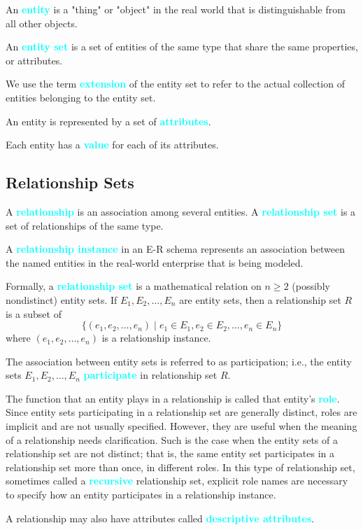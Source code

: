 \documentclass[a4paper,12pt,twoside,openany]{book}
\newcommand{\textcy}[1]{\textbf{\textcolor{cyan}{#1}}}
\begin{document}
An \textcy{entity} is a "thing" or "object" in the real world that is distinguishable from all other objects.

An \textcy{entity set} is a set of entities of the same type that share the same properties, or attributes.

We use the term \textcy{extension} of the entity set to refer to the actual collection of entities belonging to the entity set.

An entity is represented by a set of \textcy{attributes}.

Each entity has a \textcy{value} for each of its attributes.

\subsection{Relationship Sets}

A \textcy{relationship} is an association among several entities. A \textcy{relationship set} is a set of relationships of the same type.

A \textcy{relationship instance} in an E-R schema represents an association between the named entities in the real-world enterprise that is being modeled.

Formally, a \textcy{relationship set} is a mathematical relation on $n\ge 2$ (possibly nondistinct) entity sets. If $E_1,E_2,\ldots,E_n$ are entity sets, then a relationship set $R$ is a subset of $$\{(e_1,e_2,\ldots,e_n)\;|\;e_1\in E_1,e_2\in E_2,\ldots,e_n\in E_n\}$$ where $(e_1,e_2,\ldots,e_n)$ is a relationship instance.

The association between entity sets is referred to as participation; i.e., the entity sets $E_1,E_2,\ldots,E_n$ \textcy{participate} in relationship set $R$.

The function that an entity plays in a relationship is called that entity's \textcy{role}. Since entity sets participating in a relationship set are generally distinct, roles are implicit and are not usually specified. However, they are useful when the meaning of a relationship needs clarification. Such is the case when the entity sets of a relationship set are not distinct; that is, the same entity set participates in a relationship set more than once, in different roles. In this type of relationship set, sometimes called a \textcy{recursive} relationship set, explicit role names are necessary to specify how an entity participates in a relationship instance.

A relationship may also have attributes called \textcy{descriptive attributes}.
\end{document}
